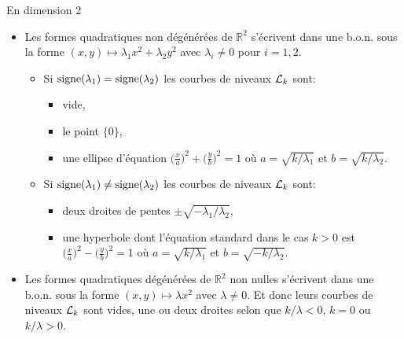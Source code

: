 \documentclass[11pt]{m53beamer}
\begin{document}
\begin{frame}{En dimension 2}
  \begin{itemize}[<+(1)->]
  \item Les formes quadratiques non dégénérées de $\mathbb{R}^{2}$ s'écrivent dans une b.o.n. sous la forme $(x,y)\mapsto \lambda_{1}x^{2}+\lambda_{2}y^{2}$ avec $\lambda_{i}\neq0$ pour $i=1,2$.
    \begin{itemize}[<+(1)->]
      \item Si $\operatorname{signe}(\lambda_{1})=\operatorname{signe}(\lambda_{2})$ les courbes de niveaux $\mathcal{L}_{k}$ sont:
      \begin{itemize}[<+(1)->]
        \item {} vide,
        \item {} le point $\{0\}$,
        \item {} une ellipse d'équation $\big(\frac{x}{a}\big)^{2}+\big(\frac{y}{b}\big)^{2}=1$ où $a=\sqrt{k/\lambda_{1}}$ et $b=\sqrt{k/\lambda_{2}}$.
      \end{itemize}
      \item Si $\operatorname{signe}(\lambda_{1})\neq\operatorname{signe}(\lambda_{2})$ les courbes de niveaux $\mathcal{L}_{k}$ sont:
      \begin{itemize}[<+(1)->]
        \item {} deux droites de pentes $\pm\sqrt{-\lambda_{1}/\lambda_{2}}$,
        \item {} une hyperbole dont l'équation standard dans le cas $k>0$ est $\big(\frac{x}{a}\big)^{2}-\big(\frac{y}{b}\big)^{2}=1$ où $a=\sqrt{k/\lambda_{1}}$ et $b=\sqrt{-k/\lambda_{2}}$.
      \end{itemize}\pause
    \end{itemize}
  \item Les formes quadratiques dégénérées de $\mathbb{R}^{2}$ non nulles s'écrivent dans une b.o.n. sous la forme $(x,y)\mapsto \lambda x^{2}$ avec $\lambda\neq0$.\pause{} Et donc leurs courbes de niveaux $\mathcal{L}_{k}$ sont vides, une ou deux droites selon que $k/\lambda<0$, $k=0$ ou $k/\lambda>0$.
  \end{itemize}
\end{frame}
\end{document}
